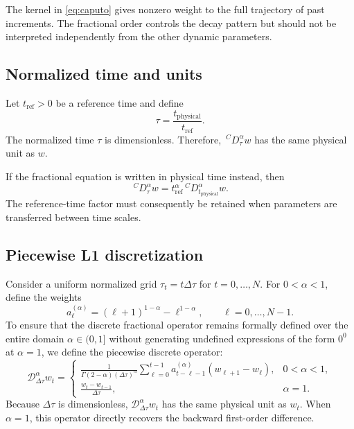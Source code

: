 \documentclass[11pt,a4paper]{article}
\newcommand{\cD}{\,{}^{C}\!D}
\begin{document}
The kernel in \cref{eq:caputo} gives nonzero weight to the full
trajectory of past increments. The fractional order controls the
decay pattern but should not be interpreted independently from the
other dynamic parameters.

\subsection{Normalized time and units}

Let \(t_{\mathrm{ref}}>0\) be a reference time and define
\[
  \tau=\frac{t_{\mathrm{physical}}}{t_{\mathrm{ref}}}.
\]
The normalized time \(\tau\) is dimensionless. Therefore,
\(\cD_{\tau}^{\alpha}w\) has the same physical unit as \(w\).

If the fractional equation is written in physical time instead, then
\[
  \cD_{\tau}^{\alpha}w
  =
  t_{\mathrm{ref}}^{\alpha}
  \cD_{t_{\mathrm{physical}}}^{\alpha}w.
\]
The reference-time factor must consequently be retained when parameters
are transferred between time scales.

\subsection{Piecewise L1 discretization}
\label{sec:piecewise-l1}

Consider a uniform normalized grid \(\tau_t=t\Delta\tau\) for
\(t=0,\ldots,N\). For \(0<\alpha<1\), define the weights
\begin{equation}
  a_{\ell}^{(\alpha)}
  =
  (\ell+1)^{1-\alpha}-\ell^{1-\alpha},
  \qquad
  \ell=0,\ldots,N-1.
  \label{eq:l1weights}
\end{equation}
To ensure that the discrete fractional operator remains formally defined
over the entire domain \(\alpha\in(0,1]\) without generating undefined
expressions of the form \(0^{0}\) at \(\alpha=1\), we define the piecewise
discrete operator:
\begin{equation}
  \mathcal{D}_{\Delta\tau}^{\alpha}w_t
  =
  \begin{cases}
    \displaystyle
    \frac{1}{
      \Gamma(2-\alpha)(\Delta\tau)^\alpha
    }
    \sum_{\ell=0}^{t-1}
    a_{t-\ell-1}^{(\alpha)}
    \left(w_{\ell+1}-w_\ell\right),
    & 0<\alpha<1,\\[3ex]
    \displaystyle
    \frac{w_t-w_{t-1}}{\Delta\tau},
    & \alpha=1.
  \end{cases}
  \label{eq:discrete-operator}
\end{equation}
Because \(\Delta\tau\) is dimensionless, \(\mathcal{D}_{\Delta\tau}^{\alpha}w_t\)
has the same physical unit as \(w_t\). When \(\alpha=1\), this operator
directly recovers the backward first-order difference.
\end{document}

